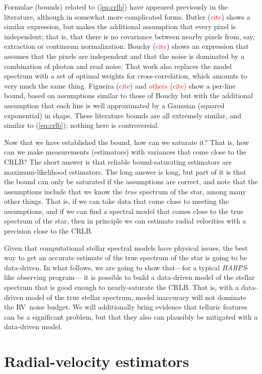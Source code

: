 \documentclass[modern]{aastex61}
\newcommand{\todo}[1]{\textcolor{red}{#1}}  %
\newcommand{\acronym}[1]{{\small{#1}}}
\newcommand{\project}[1]{\textsl{#1}}
\newcommand{\HARPS}{\project{\acronym{HARPS}}}
\newcommand{\RV}{\acronym{RV}}
\newcommand{\CRLB}{\acronym{CRLB}}
\begin{document}
Formulae (bounds) related to (\ref{eq:crlb}) have appeared previously
in the literature, although in somewhat more complicated forms.
Butler (\todo{cite}) shows a similar expression, but makes the additional
assumption that every pixel is independent; that is, that there is no
covariance between nearby pixels from, say, extraction or continuum normalization.
Bouchy (\todo{cite}) shows an expression that assumes that the pixels
are independent and that the noise is dominated by a combination of photon
and read noise. 
That work also replaces the model spectrum with a set of optimal
weights for cross-correlation, which amounts to very much the same thing.
Figueira (\todo{cite}) and \todo{others (cite)} show a per-line
bound, based on assumptions similar to those of Bouchy but with the additional assumption that
each line is well approximated by a Gaussian (squared exponential) in shape.
These literature bounds are all extremely similar, and similar to (\ref{eq:crlb});
nothing here is controversial.

Now that we have established the bound, how can we saturate it? That is,
how can we make measurements (estimators)  with variances that come close to the \CRLB?
The short answer is that reliable bound-saturating estimators are maximum-likelihood estimators.
The long answer is long, but part of it is that the bound can only be saturated if the
assumptions are correct, and note that the assumptions include that we know the
\emph{true} spectrum of the star, among many other things.
That is, if we can take data that come close to meeting the assumptions, and
if we can find a spectral model that comes close to the true spectrum of the star,
then in principle we can estimate radial velocities with a precision close to the \CRLB.

Given that computational stellar spectral models have physical issues, the best way
to get an accurate estimate of the true spectrum of the star is going to be data-driven.
In what follows, we are going to show that---for a typical \HARPS-like observing program---%
it is possible to build a data-driven model of the stellar spectrum that is good enough
to nearly-saturate the \CRLB.
That is, with a data-driven model of the true stellar spectrum, model inaccuracy will
not dominate the \RV\ noise budget.
We will additionally bring evidence that telluric features can be a significant problem,
but that they also can plausibly be mitigated with a data-driven model.

\section{Radial-velocity estimators}
\label{s:methods}
\end{document}
